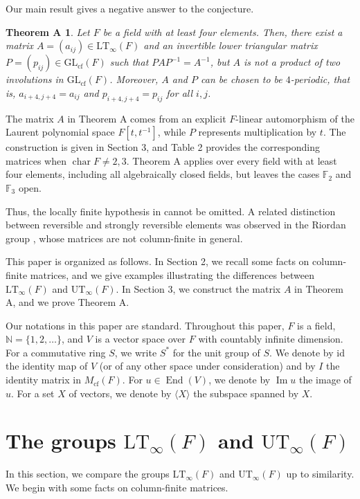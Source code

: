 \documentclass[11pt,reqno,a4paper]{amsart}
\numberwithin{equation}{section}
\theoremstyle{definition}
\theoremstyle{plain}
\newtheorem*{theoremA}{Theorem A}
\newcommand{\cf}{\mathrm{cf}}
\newcommand{\GL}{\mathrm{GL}}
\newcommand{\End}{\operatorname{End}}
\newcommand{\Imop}{\operatorname{Im}}
\newcommand{\id}{\mathrm{id}}
\newcommand{\ch}{\operatorname{char}}
\newcommand{\LT}{\mathrm{LT}_{\infty}}
\newcommand{\UT}{\mathrm{UT}_{\infty}}
\newcommand{\bbN}{\mathbb N}
\newcommand{\bbF}{\mathbb F}
\newcommand{\spann}[1]{\langle #1\rangle}
\begin{document}
Our main result gives a negative answer to the conjecture.

\begin{theoremA}
Let $F$ be a field with at least four elements. Then, there exist a matrix $A=(a_{ij})\in\LT(F)$ and an invertible lower triangular matrix $P=(p_{ij})\in\GL_{\cf}(F)$ such that $PAP^{-1}=A^{-1}$, but $A$ is not a product of two involutions in $\GL_{\cf}(F)$. Moreover, $A$ and $P$ can be chosen to be $4$-periodic, that is, $a_{i+4,j+4}=a_{ij}$ and $p_{i+4,j+4}=p_{ij}$ for all $i,j$.
\end{theoremA}

The matrix $A$ in Theorem A comes from an explicit $F$-linear automorphism of the Laurent polynomial space $F[t,t^{-1}]$, while $P$ represents multiplication by $t$. The construction is given in Section 3, and Table 2 provides the corresponding matrices when $\ch F\ne2,3$. Theorem A applies over every field with at least four elements, including all algebraically closed fields, but leaves the cases $\bbF_2$ and $\bbF_3$ open.

Thus, the locally finite hypothesis in \cite[Theorem 1.5]{pazzis2022} cannot be omitted. A related distinction between reversible and strongly reversible elements was observed in the Riordan group \cite{slowik2026}, whose matrices are not column-finite in general.

This paper is organized as follows. In Section 2, we recall some facts on column-finite matrices, and we give examples illustrating the differences between $\LT(F)$ and $\UT(F)$. In Section 3, we construct the matrix $A$ in Theorem A, and we prove Theorem A.

Our notations in this paper are standard. Throughout this paper, $F$ is a field, $\bbN=\{1,2,\ldots\}$, and $V$ is a vector space over $F$ with countably infinite dimension. For a commutative ring $S$, we write $S^*$ for the unit group of $S$. We denote by $\id$ the identity map of $V$ (or of any other space under consideration) and by $I$ the identity matrix in $M_{\cf}(F)$. For $u\in\End(V)$, we denote by $\Imop u$ the image of $u$. For a set $X$ of vectors, we denote by $\spann{X}$ the subspace spanned by $X$.

\section{The groups \texorpdfstring{$\LT(F)$ and $\UT(F)$}{LT-infinity(F) and UT-infinity(F)}}
In this section, we compare the groups $\LT(F)$ and $\UT(F)$ up to similarity. We begin with some facts on column-finite matrices.
\end{document}
